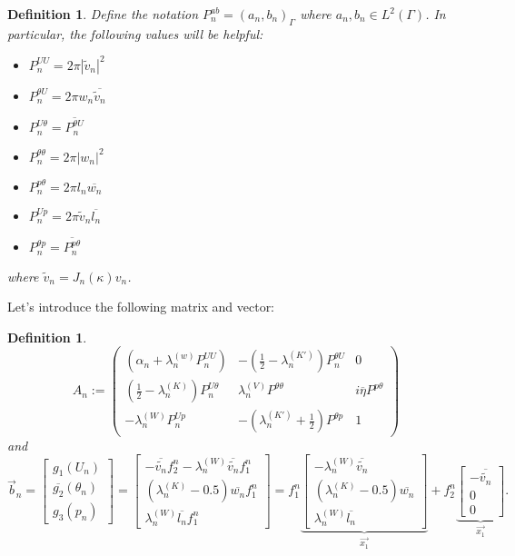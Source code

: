 \documentclass[10pt,journal,compsoc, onecolumn]{IEEEtran}
\newtheorem{definition}[theorem]{Definition}
\begin{document}
\begin{definition}
    Define the notation $P^{ab}_n = (a_n, b_n)_\Gamma$ where $a_n, b_n \in L^2(\Gamma)$. 
    In particular, the following values will be helpful: 
    \begin{itemize}
        \item $P^{UU}_n = 2\pi |\tilde v_n|^2$
        \item $P^{\theta U}_n = 2\pi w_n \overline{\tilde v_n}$
        \item $P^{U\theta}_n = \overline{P^{\theta U}_n}$
        \item $P^{\theta \theta}_n = 2 \pi |w_n|^2$
        \item $P^{p \theta}_n = 2\pi l_n\overline{w_n}$
        \item $P^{Up}_n = 2\pi \tilde v_n \overline{l_n}$
        \item $P^{\theta p}_n = \overline{P^{p\theta}_n }$
    \end{itemize}
    where $\tilde v_n = J_n(\kappa )v_n$.
\end{definition}
Let's introduce the following matrix and vector: 
\begin{definition}
    $$
    A_n:= 
    \begin{pmatrix}
        (\alpha_n + \lambda_n^{(w)} P^{UU}_n)  & - (\frac{1}{2} - \lambda_n^{(K')}) P_n^{\theta U} & 0\\
        (\frac{1}{2} - \lambda_n^{(K)})P^{U\theta}_n  & \lambda^{(V)}_n P^{\theta \theta}  &  i \overline{\eta}     P^{p \theta} \\
        -\lambda_n^{(W)} P^{Up}_n  &  - (\lambda^{(K')}_n + \frac{1}{2})  P^{\theta p} & 1 
    \end{pmatrix}
    $$
    and 
    $$
    \vec{b}_n = 
    \begin{bmatrix}
       g_1(U_n)\\
        \overline{g_2}(\theta_n) \\
        g_3(p_n)
    \end{bmatrix}
    = 
    \begin{bmatrix}
        - \overline{\tilde{v_n}} f_2^n - \lambda_n^{(W)} \overline{\tilde{v_n}} f_1^n \\
        (\lambda_n^{(K)} - 0.5)  \overline{w_n} f_1^n\\
        \lambda_n^{(W)} \overline{l_n} f_1^n
    \end{bmatrix}
= f_1^n 
\underbrace{
\begin{bmatrix}
- \lambda_n^{(W)} \overline{\tilde{v_n}} \\
(\lambda_n^{(K)} - 0.5) \overline{w_n}  \\
\lambda_n^{(W)} \overline{l_n}
\end{bmatrix}}_{\vec{x_1}}
+ f_2^n
\underbrace{\begin{bmatrix}
    - \overline{\tilde{v_n}} \\
    0 \\
    0
\end{bmatrix}}_{\vec{x_1}}.
    $$
\end{definition}
\end{document}
